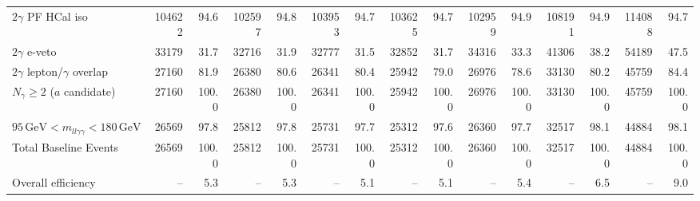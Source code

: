 \begin{table}[htbp]
{\begin{tabular}{lrrrrrrrrrrrrrr}
$2\gamma$ PF HCal iso & 104622 & 94.6 & 102597 & 94.8 & 103953 & 94.7 & 103625 & 94.7 & 102959 & 94.9 & 108191 & 94.9 & 114088 & 94.7 \\
$2\gamma$ e-veto & 33179 & 31.7 & 32716 & 31.9 & 32777 & 31.5 & 32852 & 31.7 & 34316 & 33.3 & 41306 & 38.2 & 54189 & 47.5 \\
$2\gamma$ lepton/$\gamma$ overlap & 27160 & 81.9 & 26380 & 80.6 & 26341 & 80.4 & 25942 & 79.0 & 26976 & 78.6 & 33130 & 80.2 & 45759 & 84.4 \\
$N_{\gamma}\geq 2$ ($a$ candidate) & 27160 & 100.0 & 26380 & 100.0 & 26341 & 100.0 & 25942 & 100.0 & 26976 & 100.0 & 33130 & 100.0 & 45759 & 100.0 \\
$95\,\mathrm{GeV} < m_{ll\gamma\gamma} < 180\,\mathrm{GeV}$ & 26569 & 97.8 & 25812 & 97.8 & 25731 & 97.7 & 25312 & 97.6 & 26360 & 97.7 & 32517 & 98.1 & 44884 & 98.1 \\
Total Baseline Events & 26569 & 100.0 & 25812 & 100.0 & 25731 & 100.0 & 25312 & 100.0 & 26360 & 100.0 & 32517 & 100.0 & 44884 & 100.0 \\
\hline
Overall efficiency & -- & 5.3 & -- & 5.3 & -- & 5.1 & -- & 5.1 & -- & 5.4 & -- & 6.5 & -- & 9.0 \\
\hline
\end{tabular}%
}
\end{table}

